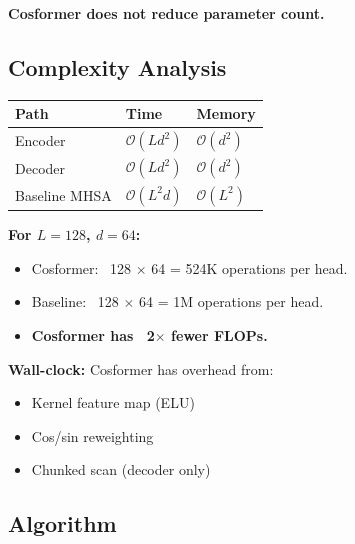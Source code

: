 \textbf{Cosformer does not reduce parameter count.}

\subsection{Complexity Analysis}

\begin{table}[H]
\centering
\small
\begin{tabular}{lll}
\toprule
\textbf{Path} & \textbf{Time} & \textbf{Memory} \\
\midrule
Encoder & $\mathcal{O}(L d^2)$ & $\mathcal{O}(d^2)$ \\
Decoder & $\mathcal{O}(L d^2)$ & $\mathcal{O}(d^2)$ \\
Baseline MHSA & $\mathcal{O}(L^2 d)$ & $\mathcal{O}(L^2)$ \\
\bottomrule
\end{tabular}
\end{table}

\textbf{For $L = 128$, $d = 64$:}
\begin{itemize}
\item Cosformer: ~128 $\times$ 64  = 524K operations per head.
\item Baseline: ~128  $\times$ 64 = 1M operations per head.
\item \textbf{Cosformer has ~2$\times$ fewer FLOPs.}

\end{itemize}
\textbf{Wall-clock:} Cosformer has overhead from:
\begin{itemize}
\item Kernel feature map (ELU)
\item Cos/sin reweighting
\item Chunked scan (decoder only)

\end{itemize}
\subsection{Algorithm}

